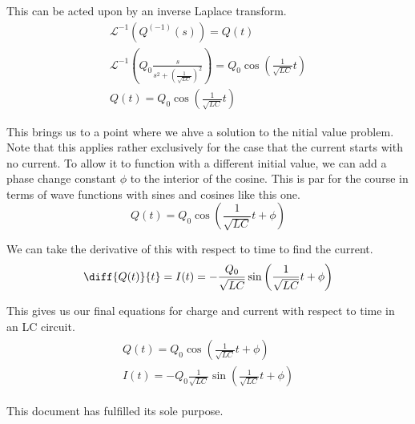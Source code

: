 \documentclass[12pt]{article}
\begin{document}
    This can be acted upon by an inverse Laplace transform.
    \begin{gather}
        \mathcal{L}^{-1} (Q^{(-1)}(s))  =   Q(t)\\
        \mathcal{L}^{-1} (Q_0 \frac{s}{s^2 + (\frac{1}{\sqrt{LC}})^2})
            =   Q_0 \cos\left( \frac{1}{\sqrt{LC}}t \right)\\
        Q(t)    =   Q_0 \cos\left( \frac{1}{\sqrt{LC}}t \right)
    \end{gather}

    This brings us to a point where we ahve a solution to the nitial value problem.
    Note that this applies rather exclusively for the case that the current starts with no current.
    To allow it to function with a different initial value, we can add a phase change constant $\phi$ to the interior of the cosine.
    This is par for the course in terms of wave functions with sines and cosines like this one.
    \begin{equation}
        Q(t)    =   Q_0 \cos\left( \frac{1}{\sqrt{LC}}t + \phi \right)
    \end{equation}

    We can take the derivative of this with respect to time to find the current.
    \begin{equation}
        \diff{Q(t)}{t}  =   I(t)    =   -\frac{Q_0}{\sqrt{LC}} \sin\left( \frac{1}{\sqrt{LC}}t + \phi \right)
    \end{equation}

    This gives us our final equations for charge and current with respect to time in an LC circuit.
    \begin{gather}
        \boxed{ \begin{matrix}
            Q(t)    =   Q_0 \cos\left( \frac{1}{\sqrt{LC}}t + \phi \right)\\
            I(t)    =   - Q_0 \frac{1}{\sqrt{LC}} \sin\left( \frac{1}{\sqrt{LC}}t + \phi \right)
        \end{matrix}}
    \end{gather}

    This document has fulfilled its sole purpose.
\end{document}
